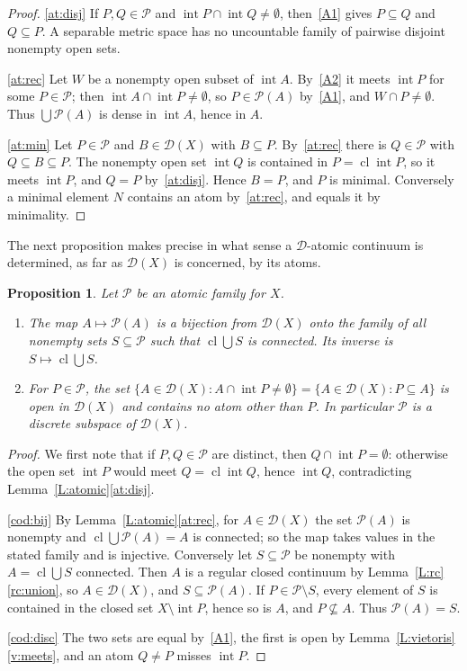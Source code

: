 \documentclass[11pt,reqno]{amsart}
\theoremstyle{plain}
\newtheorem{proposition}[theorem]{Proposition}
\theoremstyle{definition}
\theoremstyle{remark}
\newcommand{\D}{\mathcal{D}}
\newcommand{\PP}{\mathcal{P}}
\newcommand{\cl}{\operatorname{cl}}
\newcommand{\intr}{\operatorname{int}}
\begin{document}
\begin{proof}
\ref{at:disj} If $P,Q\in\PP$ and $\intr P\cap\intr Q\neq\emptyset$, then~\ref{A1} gives $P\subseteq Q$ and $Q\subseteq P$. A separable metric space has no uncountable family of pairwise disjoint nonempty open sets.

\ref{at:rec} Let $W$ be a nonempty open subset of $\intr A$. By~\ref{A2} it meets $\intr P$ for some $P\in\PP$; then $\intr A\cap\intr P\neq\emptyset$, so $P\in\PP(A)$ by~\ref{A1}, and $W\cap P\neq\emptyset$. Thus $\bigcup\PP(A)$ is dense in $\intr A$, hence in $A$.

\ref{at:min} Let $P\in\PP$ and $B\in\D(X)$ with $B\subseteq P$. By~\ref{at:rec} there is $Q\in\PP$ with $Q\subseteq B\subseteq P$. The nonempty open set $\intr Q$ is contained in $P=\cl\intr P$, so it meets $\intr P$, and $Q=P$ by~\ref{at:disj}. Hence $B=P$, and $P$ is minimal. Conversely a minimal element $N$ contains an atom by~\ref{at:rec}, and equals it by minimality.
\end{proof}

The next proposition makes precise in what sense a $\D$-atomic continuum is determined, as far as $\D(X)$ is concerned, by its atoms.

\begin{proposition}\label{P:coding}
Let $\PP$ be an atomic family for $X$.
\begin{enumerate}[label=\textup{(\alph*)}]
\item\label{cod:bij} The map $A\mapsto\PP(A)$ is a bijection from $\D(X)$ onto the family of all nonempty sets $S\subseteq\PP$ such that $\cl\bigcup S$ is connected. Its inverse is $S\mapsto\cl\bigcup S$.
\item\label{cod:disc} For $P\in\PP$, the set $\{A\in\D(X):A\cap\intr P\neq\emptyset\}=\{A\in\D(X):P\subseteq A\}$ is open in $\D(X)$ and contains no atom other than $P$. In particular $\PP$ is a discrete subspace of $\D(X)$.
\end{enumerate}
\end{proposition}

\begin{proof}
We first note that if $P,Q\in\PP$ are distinct, then $Q\cap\intr P=\emptyset$: otherwise the open set $\intr P$ would meet $Q=\cl\intr Q$, hence $\intr Q$, contradicting Lemma~\ref{L:atomic}\ref{at:disj}.

\ref{cod:bij} By Lemma~\ref{L:atomic}\ref{at:rec}, for $A\in\D(X)$ the set $\PP(A)$ is nonempty and $\cl\bigcup\PP(A)=A$ is connected; so the map takes values in the stated family and is injective. Conversely let $S\subseteq\PP$ be nonempty with $A=\cl\bigcup S$ connected. Then $A$ is a regular closed continuum by Lemma~\ref{L:rc}\ref{rc:union}, so $A\in\D(X)$, and $S\subseteq\PP(A)$. If $P\in\PP\setminus S$, every element of $S$ is contained in the closed set $X\setminus\intr P$, hence so is $A$, and $P\not\subseteq A$. Thus $\PP(A)=S$.

\ref{cod:disc} The two sets are equal by~\ref{A1}, the first is open by Lemma~\ref{L:vietoris}\ref{v:meets}, and an atom $Q\neq P$ misses $\intr P$.
\end{proof}
\end{document}
